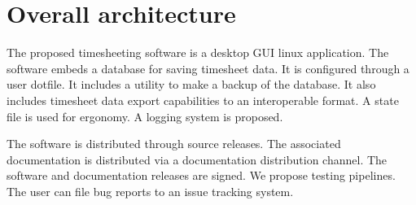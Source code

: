 \section{Overall architecture} \label{sec:overall}
The proposed timesheeting software is a desktop GUI linux application.
The software embeds a database for saving timesheet data. It is
configured through a user dotfile. It includes a utility to make
a backup of the database. It also includes timesheet data export
capabilities to an interoperable format. A state file is used
for ergonomy. A logging system is proposed.

The software is distributed through source releases. The associated
documentation is distributed via a documentation distribution channel.
The software and documentation releases are signed. We propose
testing pipelines. The user can file bug reports to an issue
tracking system.
